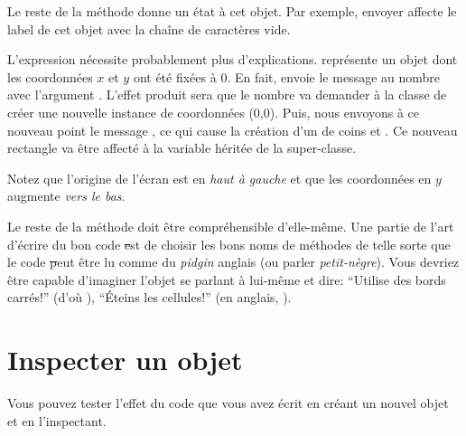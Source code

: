 \documentclass[a4paper,10pt,twoside]{book}
\begin{document}
Le reste de la méthode donne un état à cet objet.
Par exemple, envoyer  affecte le label de cet objet avec la chaîne de caractères vide.

L'expression  nécessite probablement plus d'explications.
 représente un objet  dont les coordonnées $x$ et $y$ ont été fixées à 0.
En fait,  envoie le message %
au nombre  avec l'argument .
L'effet produit sera que le nombre  va demander à la classe  de créer une nouvelle instance de coordonnées (0,0).
Puis, nous envoyons à ce nouveau point le message , ce qui cause la création d'un  de coins  et .
Ce nouveau rectangle va être affecté à la variable  héritée de la super-classe.

Notez que l'origine de l'écran \sq est en \emph{haut à gauche} et que les coordonnées en $y$ augmente \emph{vers le bas}.

Le reste de la méthode doit être compréhensible d'elle-même.
Une partie de l'art d'écrire du bon code \st est de choisir les bons
noms de méthodes de telle sorte que le code \st peut être lu comme du
\emph{pidgin} anglais (ou parler \textit{petit-n\`egre}).
Vous devriez être capable d'imaginer l'objet se parlant à lui-même et
dire:  ``Utilise des bords carr\'es!'' (d'o\`u ),
``\'Eteins les cellules!'' (en anglais, ).

\section{Inspecter un objet}

Vous pouvez tester l'effet du code que vous avez écrit en créant un nouvel objet  et en l'inspectant.
\end{document}
